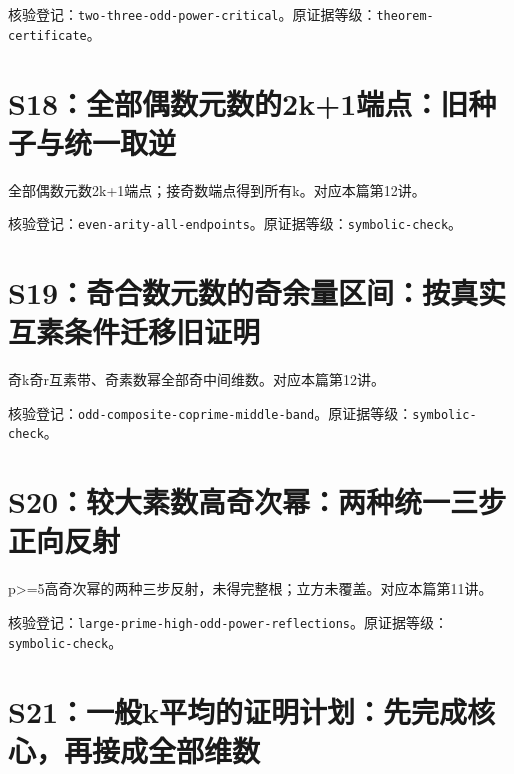 \documentclass[11pt,a4paper,oneside,openany]{book}
\theoremstyle{definition}\newtheorem{example}[theorem]{例}\newtheorem{conjecture}[theorem]{猜想}
\numberwithin{equation}{chapter}\setcounter{tocdepth}{1}
\begin{document}
核验登记：{\small\nolinkurl{two-three-odd-power-critical}}。原证据等级：{\small\nolinkurl{theorem-certificate}}。

\section{S18：全部偶数元数的2k+1端点：旧种子与统一取逆}\label{source:S18}

全部偶数元数2k+1端点；接奇数端点得到所有k。对应本篇第12讲。

\par{}\par

核验登记：{\small\nolinkurl{even-arity-all-endpoints}}。原证据等级：{\small\nolinkurl{symbolic-check}}。

\section{S19：奇合数元数的奇余量区间：按真实互素条件迁移旧证明}\label{source:S19}

奇k奇r互素带、奇素数幂全部奇中间维数。对应本篇第12讲。

\par{}\par

核验登记：{\small\nolinkurl{odd-composite-coprime-middle-band}}。原证据等级：{\small\nolinkurl{symbolic-check}}。

\section{S20：较大素数高奇次幂：两种统一三步正向反射}\label{source:S20}

p>=5高奇次幂的两种三步反射，未得完整根；立方未覆盖。对应本篇第11讲。

\par{}\par

核验登记：{\small\nolinkurl{large-prime-high-odd-power-reflections}}。原证据等级：{\small\nolinkurl{symbolic-check}}。

\section{S21：一般k平均的证明计划：先完成核心，再接成全部维数}\label{source:S21}
\end{document}
